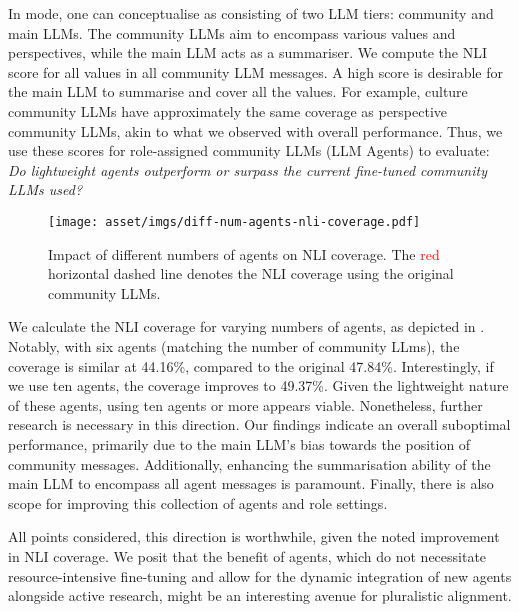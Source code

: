 In \overton mode, one can conceptualise \modplural as consisting of two LLM tiers: community and main LLMs. The community LLMs aim to encompass various values and perspectives, while the main LLM acts as a summariser. We compute the NLI score for all values in all community LLM messages. A high score is desirable for the main LLM to summarise and cover all the values. For example, culture community LLMs have approximately the same coverage as perspective community LLMs, akin to what we observed with overall \overton performance. Thus, we use these scores for role-assigned community LLMs (\aka LLM Agents) to evaluate: \emph{Do lightweight agents outperform or surpass the current fine-tuned community LLMs used?}

\begin{figure}[!t]
    \centering
    \texttt{[image: asset/imgs/diff-num-agents-nli-coverage.pdf]}
    \vspace{-0.3cm}
    \caption{Impact of different numbers of agents on \overton NLI coverage. The \textcolor{red}{red} horizontal dashed line denotes the NLI coverage using the original community LLMs.}
    \label{fig:diff-agents-nli-coverage}
    \vspace{-0.3cm}
\end{figure}

We calculate the NLI coverage for varying numbers of agents, as depicted in . Notably, with six agents (matching the number of community LLms), the coverage is similar at 44.16\%, compared to the original 47.84\%. Interestingly, if we use ten agents, the coverage improves to 49.37\%. Given the lightweight nature of these agents, using ten agents or more appears viable. Nonetheless, further research is necessary in this direction. Our findings indicate an overall suboptimal performance, primarily due to the main LLM's bias towards the position of community messages. Additionally, enhancing the summarisation ability of the main LLM to encompass all agent messages is paramount. Finally, there is also scope for improving this collection of agents and role settings. 

All points considered, this direction is worthwhile, given the noted improvement in NLI coverage. We posit that the benefit of agents, which do not necessitate resource-intensive fine-tuning and allow for the dynamic integration of new agents alongside active research, might be an interesting avenue for pluralistic alignment.

